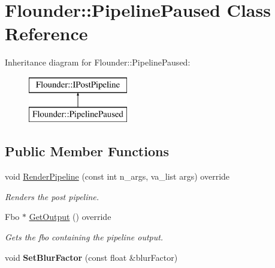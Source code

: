 \hypertarget{class_flounder_1_1_pipeline_paused}{}\section{Flounder\+:\+:Pipeline\+Paused Class Reference}
\label{class_flounder_1_1_pipeline_paused}
Inheritance diagram for Flounder\+:\+:Pipeline\+Paused\+:\begin{figure}[H]
\begin{center}
\leavevmode
\includegraphics[height=2.000000cm]{class_flounder_1_1_pipeline_paused}
\end{center}
\end{figure}
\subsection*{Public Member Functions}
\begin{DoxyCompactItemize}
\item 
void \hyperlink{class_flounder_1_1_pipeline_paused_a7cb1dcc1e1321e725e4292d305bfacc3}{Render\+Pipeline} (const int n\+\_\+args, va\+\_\+list args) override
\begin{DoxyCompactList}\small\item\em Renders the post pipeline. \end{DoxyCompactList}\item 
Fbo $\ast$ \hyperlink{class_flounder_1_1_pipeline_paused_aec5ab7753183681ed2d97d9f6b4781ef}{Get\+Output} () override
\begin{DoxyCompactList}\small\item\em Gets the fbo containing the pipeline output. \end{DoxyCompactList}\item 
\mbox{\label{class_flounder_1_1_pipeline_paused_a1a5c9bcdaa1b271725d437541893bcea}} 
void {\bfseries Set\+Blur\+Factor} (const float \&blur\+Factor)
\end{DoxyCompactItemize}
